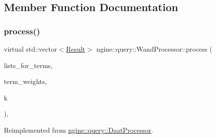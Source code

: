 \subsection{Member Function Documentation}
\mbox{\label{classngine_1_1query_1_1WandProcessor_a7e25bc04d4e2efeab18944fd52a39a38}} 
\subsubsection{\texorpdfstring{process()}{process()}}
{\footnotesize\ttfamily virtual std\+::vector$<$\hyperlink{structngine_1_1query_1_1Result}{Result}$>$ ngine\+::query\+::\+Wand\+Processor\+::process (\begin{DoxyParamCaption}\item[{std\+::vector$<$ \hyperlink{classngine_1_1PostingList}{Posting\+List} $>$ \&}]{lists\+\_\+for\+\_\+terms,  }\item[{const std\+::vector$<$ \hyperlink{structngine_1_1Score}{Score} $>$ \&}]{term\+\_\+weights,  }\item[{const std\+::size\+\_\+t}]{k }\end{DoxyParamCaption})\hspace{0.3cm}{\ttfamily [inline]}, {\ttfamily [virtual]}}



Reimplemented from \hyperlink{classngine_1_1query_1_1DaatProcessor_a5d5eee5d923afd4929f05f7f38d25bfb}{ngine\+::query\+::\+Daat\+Processor}.

\mbox{\label{classngine_1_1query_1_1WandProcessor_a6363745437db39b4196a2858b6ea3a98}} 
